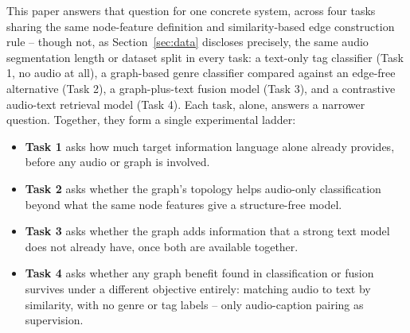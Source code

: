 This paper answers that question for one concrete system, across four tasks sharing the same
node-feature definition and similarity-based edge construction rule -- though not, as
Section~\ref{sec:data} discloses precisely, the same audio segmentation length or dataset
split in every task: a text-only tag classifier (Task 1, no audio at all), a graph-based
genre classifier compared against an edge-free alternative (Task 2), a graph-plus-text fusion
model (Task 3), and a contrastive audio-text retrieval model (Task 4). Each task, alone,
answers a narrower question. Together, they form a single experimental ladder:

\begin{itemize}
\item \textbf{Task 1} asks how much target information language alone already provides,
before any audio or graph is involved.
\item \textbf{Task 2} asks whether the graph's topology helps audio-only classification
beyond what the same node features give a structure-free model.
\item \textbf{Task 3} asks whether the graph adds information that a strong text model does
not already have, once both are available together.
\item \textbf{Task 4} asks whether any graph benefit found in classification or fusion
survives under a different objective entirely: matching audio to text by similarity, with no
genre or tag labels -- only audio-caption pairing as supervision.
\end{itemize}

